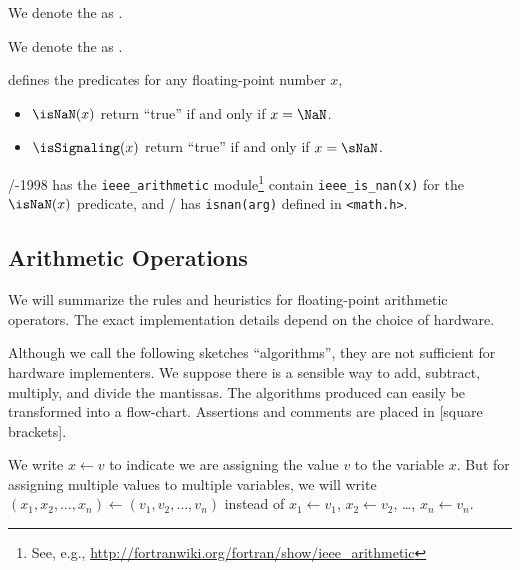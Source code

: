 \begin{defn}
  We denote the  as \qNaN.
\end{defn}
\begin{defn}
  We denote the  as \sNaN.
\end{defn}
\begin{defn}
   defines the predicates for any floating-point number $x$,
  \begin{itemize}
  \item $\isNaN(x)$ return ``true'' if and only if $x=\NaN$. 
  \item $\isSignaling(x)$ return ``true'' if and only if $x=\sNaN$.
  \end{itemize}
\end{defn}
\begin{rmk}
  \FORTRAN/-1998 has the \verb|ieee_arithmetic| module\footnote{See,
  e.g., \url{http://fortranwiki.org/fortran/show/ieee_arithmetic}}
  contain \verb|ieee_is_nan(x)| for the $\isNaN(x)$
  predicate, and \CEE/ has \verb|isnan(arg)| defined in \verb|<math.h>|.
\end{rmk}


\subsection{Arithmetic Operations}

We will summarize the rules and heuristics for floating-point arithmetic
operators. The exact implementation details depend on the choice of
hardware.

\begin{danger}
  Although we call the following sketches ``algorithms'', they are not
  sufficient for hardware implementers. We suppose there is a sensible
  way to add, subtract, multiply, and divide the mantissas. The
  algorithms produced can easily be transformed into a
  flow-chart. Assertions and comments are placed in [square brackets].
\end{danger}

\begin{notation}
  We write $x\gets v$ to indicate we are assigning the value $v$ to the
  variable $x$. But for assigning multiple values to multiple variables,
  we will write $(x_{1}, x_{2}, \dots, x_{n})\gets(v_{1},v_{2},\dots,v_{n})$
  instead of $x_{1}\gets v_{1}$, $x_{2}\gets v_{2}$, \dots, $x_{n}\gets v_{n}$.
\end{notation}

